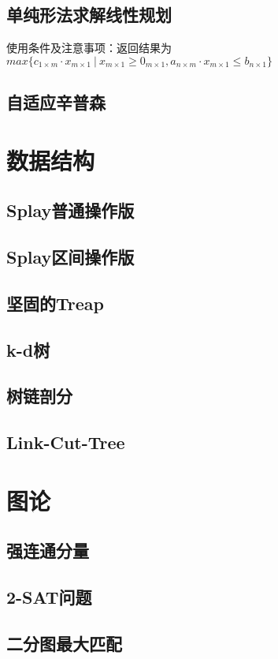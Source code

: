 \documentclass[openany, a4paper, 10pt]{book}
\begin{document}
\begin{spacing}{1.1}
		\section{单纯形法求解线性规划}
			使用条件及注意事项：返回结果为$max\{c_{1 \times m} \cdot x_{m \times 1} \ | \ x_{m \times 1} \geq 0_{m \times 1}, a_{n \times m} \cdot x_{m \times 1} \leq b_{n \times 1}\}$
			
		\section{自适应辛普森}
			
	\chapter{数据结构}
		\section{Splay普通操作版}
		\section{Splay区间操作版}
		\section{坚固的Treap}
		\section{k-d树}
		\section{树链剖分}
		\section{Link-Cut-Tree}
	\chapter{图论}
		\section{强连通分量}
			
		\section{2-SAT问题}
			
		\section{二分图最大匹配}

\end{spacing}
\end{document}
